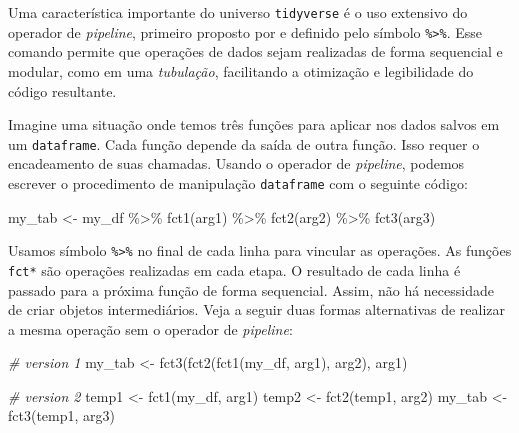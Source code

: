 \documentclass[
  11pt,
]{book}
\newenvironment{Shaded}{\begin{snugshade}}{\end{snugshade}}
\newcommand{\CommentTok}[1]{\textcolor[rgb]{0.37,0.37,0.37}{\textit{#1}}}
\newcommand{\FunctionTok}[1]{\textcolor[rgb]{0,0,0}{#1}}
\newcommand{\NormalTok}[1]{#1}
\newcommand{\OtherTok}[1]{\textcolor[rgb]{0.37,0.37,0.37}{#1}}
\newcommand{\SpecialCharTok}[1]{\textcolor[rgb]{0,0,0}{#1}}
\begin{document}
Uma característica importante do universo \texttt{tidyverse} é o uso extensivo do operador de \emph{pipeline}, primeiro proposto por \citet{R-magrittr} e definido pelo símbolo \texttt{\%\textgreater{}\%}. Esse comando permite que operações de dados sejam realizadas de forma sequencial e modular, como em uma \emph{tubulação}, facilitando a otimização e legibilidade do código resultante.

Imagine uma situação onde temos três funções para aplicar nos dados salvos em um \texttt{dataframe}. Cada função depende da saída de outra função. Isso requer o encadeamento de suas chamadas. Usando o operador de \emph{pipeline}, podemos escrever o procedimento de manipulação \texttt{dataframe} com o seguinte código: 

\begin{Shaded}
\begin{Highlighting}[]
\NormalTok{my\_tab }\OtherTok{\textless{}{-}}\NormalTok{ my\_df }\SpecialCharTok{\%\textgreater{}\%}
  \FunctionTok{fct1}\NormalTok{(arg1) }\SpecialCharTok{\%\textgreater{}\%}
  \FunctionTok{fct2}\NormalTok{(arg2) }\SpecialCharTok{\%\textgreater{}\%}
  \FunctionTok{fct3}\NormalTok{(arg3)}
\end{Highlighting}
\end{Shaded}

Usamos símbolo \texttt{\%\textgreater{}\%} no final de cada linha para vincular as operações. As funções \texttt{fct*} são operações realizadas em cada etapa. O resultado de cada linha é passado para a próxima função de forma sequencial. Assim, não há necessidade de criar objetos intermediários. Veja a seguir duas formas alternativas de realizar a mesma operação sem o operador de \emph{pipeline}:

\begin{Shaded}
\begin{Highlighting}[]
\CommentTok{\# version 1}
\NormalTok{my\_tab }\OtherTok{\textless{}{-}} \FunctionTok{fct3}\NormalTok{(}\FunctionTok{fct2}\NormalTok{(}\FunctionTok{fct1}\NormalTok{(my\_df,}
\NormalTok{                         arg1),}
\NormalTok{                    arg2),}
\NormalTok{               arg1)}

\CommentTok{\# version 2}
\NormalTok{temp1 }\OtherTok{\textless{}{-}} \FunctionTok{fct1}\NormalTok{(my\_df, arg1)}
\NormalTok{temp2 }\OtherTok{\textless{}{-}} \FunctionTok{fct2}\NormalTok{(temp1, arg2)}
\NormalTok{my\_tab }\OtherTok{\textless{}{-}} \FunctionTok{fct3}\NormalTok{(temp1, arg3)}
\end{Highlighting}
\end{Shaded}
\end{document}
